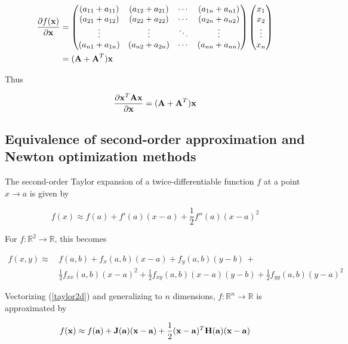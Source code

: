 \documentclass{article}
\newcommand{\R}{\mathbb{R}}
\newcommand{\vect}[1]{\textbf{\textrm{#1}}}
\newcommand{\pd}[2]{\frac{\partial {#1}}{\partial {#2}}}
\begin{document}
\begin{align*}
	\pd{f(\vect{x})}{\vect{x}} & = 
	\begin{pmatrix}
		(a_{11} + a_{11}) & (a_{12} + a_{21}) & \cdots & (a_{1n} + a_{n1}) \\
		(a_{21} + a_{12}) & (a_{22} + a_{22}) & \cdots & (a_{2n} + a_{n2}) \\
		\vdots & \vdots & \ddots & \vdots \\
		(a_{n1} + a_{1n}) & (a_{n2} + a_{2n}) & \cdots & (a_{nn} + a_{nn}) 
	\end{pmatrix} 
	\begin{pmatrix}
		x_1 \\ 
		x_2 \\ 
		\vdots \\ 
		x_n
	\end{pmatrix} \\
	& = (\vect{A} + \vect{A}^{T})\vect{x}
\end{align*}

Thus

\begin{equation} \label{scalargradqf}
	\pd{\vect{x}^{T}\vect{Ax}}{\vect{x}} = (\vect{A} + \vect{A}^{T})\vect{x}
\end{equation}

\subsection{Equivalence of second-order approximation and Newton optimization methods}
The second-order Taylor expansion of a twice-differentiable function $f$ at a point $x \rightarrow a$ is given by

\begin{equation} \label{taylor1d}
	f(x) \approx f(a) + f'(a)(x - a) + \frac{1}{2}f''(a)(x - a)^2
\end{equation}

For $f: \R^2 \rightarrow \R$, this becomes

\begin{align} \label{taylor2d}
	f(x,y) \approx \, & f(a,b) + f_x(a,b)(x - a) + f_y(a,b)(y - b) \, + \nonumber \\
					   & \frac{1}{2}f_{xx}(a,b)(x - a)^2 + \frac{1}{2}f_{xy}(a,b)(x - a)(y - b) + 
						 \frac{1}{2}f_{yy}(a,b)(y - a)^2 
\end{align}
 
Vectorizing (\ref{taylor2d}) and generalizing to $n$ dimensions, $f: \R^n \rightarrow \R$ is approximated by

\begin{equation} \label{taylornd}
	f(\vect{x}) \approx f(\vect{a}) + \vect{J}(\vect{a})(\vect{x} - \vect{a}) + 
						 \frac{1}{2}(\vect{x} - \vect{a})^{T}\vect{H}(\vect{a})(\vect{x} - \vect{a})
\end{equation}
\end{document}
